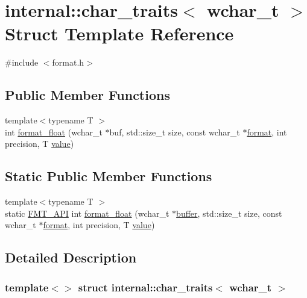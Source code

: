 \hypertarget{structinternal_1_1char__traits_3_01wchar__t_01_4}{}\section{internal\+:\+:char\+\_\+traits$<$ wchar\+\_\+t $>$ Struct Template Reference}
\label{structinternal_1_1char__traits_3_01wchar__t_01_4}


{\ttfamily \#include $<$format.\+h$>$}

\subsection*{Public Member Functions}
\begin{DoxyCompactItemize}
\item 
{\footnotesize template$<$typename T $>$ }\\int \hyperlink{structinternal_1_1char__traits_3_01wchar__t_01_4_a878ac8c1d072f99c7ff5ea34e3c42745}{format\+\_\+float} (wchar\+\_\+t $\ast$buf, std\+::size\+\_\+t size, const wchar\+\_\+t $\ast$\hyperlink{locale_8h_a4d9ddd9260f49d99308d41580d169bd2}{format}, int precision, T \hyperlink{classinternal_1_1value}{value})
\end{DoxyCompactItemize}
\subsection*{Static Public Member Functions}
\begin{DoxyCompactItemize}
\item 
{\footnotesize template$<$typename T $>$ }\\static \hyperlink{core_8h_a9a4960b70582ed2620911a0b75dce0b5}{F\+M\+T\+\_\+\+A\+PI} int \hyperlink{structinternal_1_1char__traits_3_01wchar__t_01_4_aecc8562056dde5f776293183fe405219}{format\+\_\+float} (wchar\+\_\+t $\ast$\hyperlink{namespaceinternal_a5fcdbc3efad1f390e6c3f0fdafa56122}{buffer}, std\+::size\+\_\+t size, const wchar\+\_\+t $\ast$\hyperlink{locale_8h_a4d9ddd9260f49d99308d41580d169bd2}{format}, int precision, T \hyperlink{classinternal_1_1value}{value})
\end{DoxyCompactItemize}


\subsection{Detailed Description}
\subsubsection*{template$<$$>$\newline
struct internal\+::char\+\_\+traits$<$ wchar\+\_\+t $>$}



